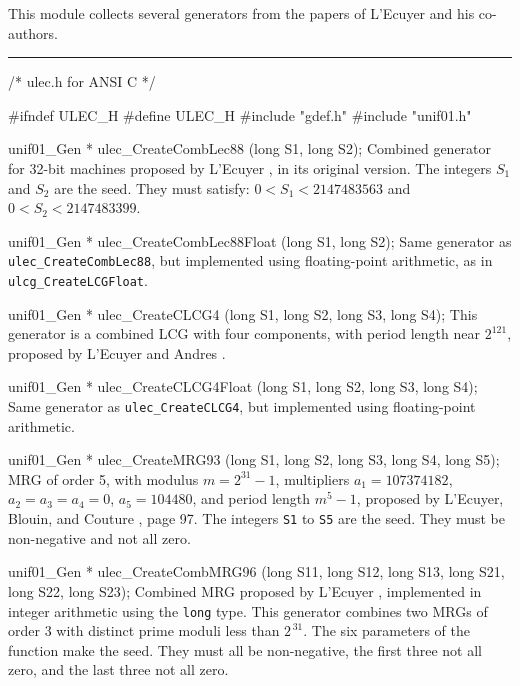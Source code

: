 
This module collects several generators from the papers of
L'Ecuyer and his co-authors.

\bigskip
\hrule
\code
\hide
/*  ulec.h  for ANSI C  */

#ifndef ULEC_H
#define ULEC_H
\endhide
#include "gdef.h"
#include "unif01.h"


unif01_Gen * ulec_CreateCombLec88 (long S1, long S2);
\endcode
 \tab  Combined generator for 32-bit machines proposed by
  L'Ecuyer \cite{rLEC88a}, in its original version.
%
  The integers $S_1$ and $S_2$ are the seed.
  They must satisfy: $0 < S_1 < 2147483563$ and $0 < S_2 < 2147483399$.
 \endtab
\code


unif01_Gen * ulec_CreateCombLec88Float (long S1, long S2);
\endcode
 \tab  Same generator as {\tt ulec\_CreateCombLec88},
  but implemented using floating-point arithmetic, as in
  {\tt ulcg\_CreateLCGFloat}.
 \endtab
\code


unif01_Gen * ulec_CreateCLCG4 (long S1, long S2, long S3, long S4);
\endcode
 \tab  This generator is a combined LCG with four components,
%
  with period length near $2^{121}$,
  proposed by L'Ecuyer and Andres \cite{rLEC97d}.
 \endtab
\code


unif01_Gen * ulec_CreateCLCG4Float (long S1, long S2, long S3, long S4);
\endcode
 \tab  Same generator as {\tt ulec\_CreateCLCG4},
  but implemented using floating-point arithmetic.
 \endtab
\code


unif01_Gen * ulec_CreateMRG93 (long S1, long S2, long S3, long S4, long S5);
\endcode
 \tab  MRG of order 5, with modulus $m=2^{31}-1$, multipliers
   $a_1 = 107374182$, $a_2 = a_3 = a_4 = 0$, $a_5 = 104480$,
   and period length $m^5-1$, proposed by
  L'Ecuyer, Blouin, and Couture \cite{rLEC93a}, page 97.
%
  The integers {\tt S1} to {\tt S5} are the seed.
  They must be non-negative and not all zero.
 \endtab
\code


unif01_Gen * ulec_CreateCombMRG96 (long S11, long S12, long S13, 
                                   long S21, long S22, long S23);
\endcode
 \tab  Combined MRG proposed by L'Ecuyer \cite{rLEC96b}, implemented
   in integer arithmetic using the {\tt long} type.
   This generator combines two MRGs of order 3 with distinct prime
%
   moduli less than $2^{\,31}$.
   The six parameters of the function make the seed.
   They must all be non-negative, the first three not all zero,
   and the last three not all zero.
 \endtab
\code


